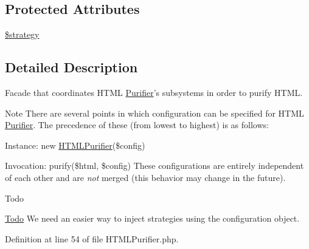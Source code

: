 \subsection*{Protected Attributes}
\begin{DoxyCompactItemize}
\item 
\hyperlink{classHTMLPurifier_a43bcd3ebc364d2fe66b412df5ce03200}{\$strategy}
\end{DoxyCompactItemize}


\subsection{Detailed Description}
Facade that coordinates H\+T\+M\+L \hyperlink{classPurifier}{Purifier}'s subsystems in order to purify H\+T\+M\+L.

\begin{DoxyNote}{Note}
There are several points in which configuration can be specified for H\+T\+M\+L \hyperlink{classPurifier}{Purifier}. The precedence of these (from lowest to highest) is as follows\+:
\begin{DoxyEnumerate}
\item Instance\+: new \hyperlink{classHTMLPurifier}{H\+T\+M\+L\+Purifier}(\$config)
\item Invocation\+: purify(\$html, \$config) These configurations are entirely independent of each other and are {\itshape not} merged (this behavior may change in the future).
\end{DoxyEnumerate}
\end{DoxyNote}
\begin{DoxyRefDesc}{Todo}
\item[\hyperlink{todo__todo000035}{Todo}]We need an easier way to inject strategies using the configuration object. \end{DoxyRefDesc}


Definition at line 54 of file H\+T\+M\+L\+Purifier.\+php.



